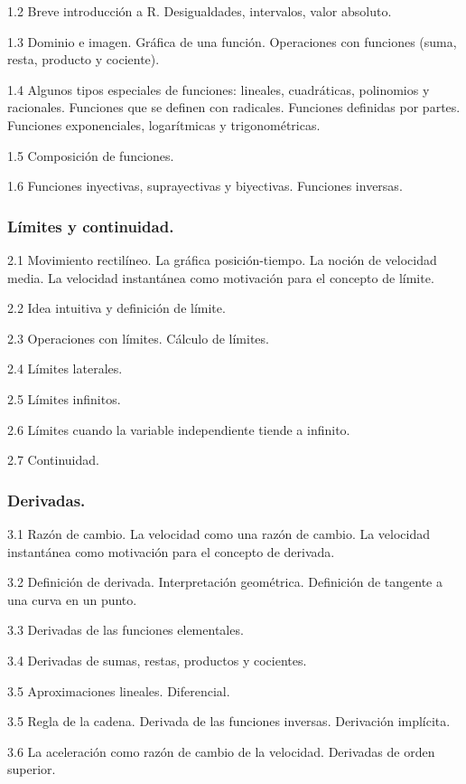 \documentclass[12pt]{article}
\begin{document}
1.2 Breve introducción a R. Desigualdades, intervalos, valor absoluto.

1.3 Dominio e imagen. Gráfica de una función. Operaciones con funciones
(suma, resta, producto y cociente).

1.4 Algunos tipos especiales de funciones: lineales, cuadráticas,
polinomios y racionales. Funciones que se definen con radicales.
Funciones definidas por partes. Funciones exponenciales, logarítmicas y
trigonométricas.

1.5 Composición de funciones.

1.6 Funciones inyectivas, suprayectivas y biyectivas. Funciones
inversas.

\subsubsection{Límites y continuidad.}\label{luxedmites-y-continuidad.}

2.1 Movimiento rectilíneo. La gráfica posición-tiempo. La noción de
velocidad media. La velocidad instantánea como motivación para el
concepto de límite.

2.2 Idea intuitiva y definición de límite.

2.3 Operaciones con límites. Cálculo de límites.

2.4 Límites laterales.

2.5 Límites infinitos.

2.6 Límites cuando la variable independiente tiende a infinito.

2.7 Continuidad.

\subsubsection{Derivadas.}\label{derivadas.}

3.1 Razón de cambio. La velocidad como una razón de cambio. La velocidad
instantánea como motivación para el concepto de derivada.

3.2 Definición de derivada. Interpretación geométrica. Definición de
tangente a una curva en un punto.

3.3 Derivadas de las funciones elementales.

3.4 Derivadas de sumas, restas, productos y cocientes.

3.5 Aproximaciones lineales. Diferencial.

3.5 Regla de la cadena. Derivada de las funciones inversas. Derivación
implícita.

3.6 La aceleración como razón de cambio de la velocidad. Derivadas de
orden superior.
\end{document}
